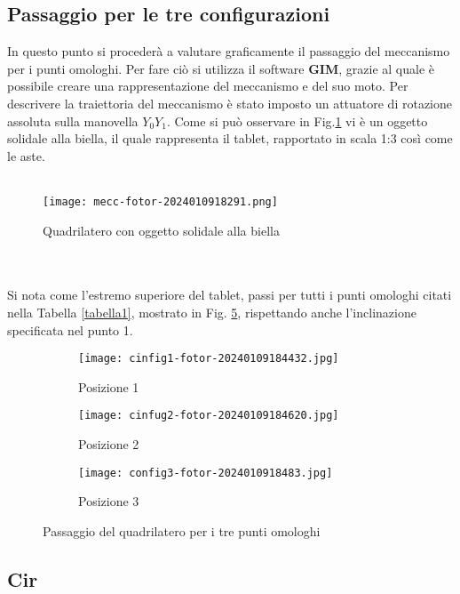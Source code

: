 \documentclass{article}
\begin{document}
\subsection{Passaggio per le tre configurazioni}
In questo punto si procederà a valutare graficamente il passaggio del mec\-ca\-nis\-mo per i punti omologhi.
Per fare ciò si utilizza il software \textbf{GIM}, grazie al quale è possibile creare una rappresentazione del meccanismo e del suo moto.
Per descrivere la traiettoria del meccanismo è stato imposto un attuatore di rotazione assoluta sulla manovella $Y_0Y_1$.
Come si può osservare in Fig.\ref{mecc} vi è un oggetto solidale alla biella, il quale rappresenta il tablet, rapportato in scala 1:3 così come le aste.
\\
\\
\begin{figure} [h!]
    \centering
    \texttt{[image: mecc-fotor-2024010918291.png]}
    \caption{Quadrilatero con oggetto solidale alla biella}
    \label{mecc}
\end{figure}
\\
\\
Si nota come l’estremo superiore del tablet, passi per tutti i punti omologhi citati nella Tabella \ref{tabella1}, mostrato in Fig. \ref{3config}, rispettando anche l’inclinazione spe\-ci\-fi\-ca\-ta nel punto 1.
\begin{figure} [h!]
    \begin{subfigure}{0.57\textwidth}
        \texttt{[image: cinfig1-fotor-20240109184432.jpg]}
        \caption{Posizione 1}
        \label{posizione1}
    \end{subfigure}
    \begin{subfigure}{0.57\textwidth}
        \texttt{[image: cinfug2-fotor-20240109184620.jpg]}
        \caption{Posizione 2}
        \label{posizione2}
    \end{subfigure}
    \begin{subfigure}{0.57\textwidth}
        \texttt{[image: config3-fotor-2024010918483.jpg]}
        \caption{Posizione 3}
        \label{posizione3}
    \end{subfigure}
    \caption{Passaggio del quadrilatero per i tre punti omologhi}
    \label{3config}
\end{figure}
\newpage
\subsection{Cir}
\end{document}

